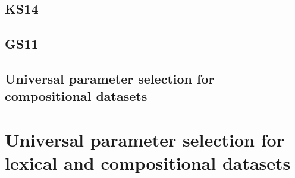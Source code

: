\subsection{KS14}
\label{sec:ks14}



\subsection{GS11}
\label{sec:gs11}




\subsection{Universal parameter selection for compositional datasets}
\label{sec:robust-param-comp-selecion}

\section{Universal parameter selection for lexical and compositional datasets}
\label{sec:universal-param-selection}






